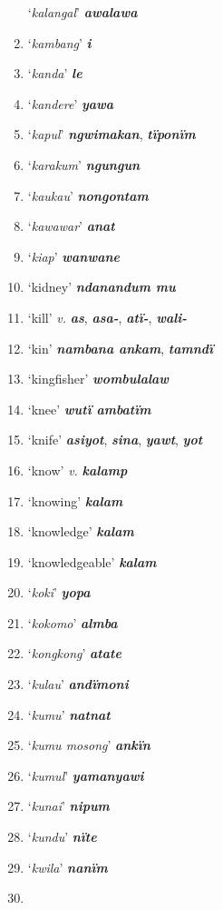 \begin{enumerate}[noitemsep, label={}, align=left, widest=190, labelsep=1ex,leftmargin=*,itemindent=-10pt]
‘\textit{kalangal}’ \textbf{\textit{awalawa}} \item
‘\textit{kambang}’ \textbf{\textit{i}} \item
‘\textit{kanda}’ \textbf{\textit{le}} \item
‘\textit{kandere}’ \textbf{\textit{yawa}} \item
‘\textit{kapul}’ \textbf{\textit{ngwimakan}}, \textbf{\textit{tïponïm}} \item
‘\textit{karakum}’ \textbf{\textit{ngungun}} \item
‘\textit{kaukau}’ \textbf{\textit{nongontam}} \item
‘\textit{kawawar}’ \textbf{\textit{anat}} \item
‘\textit{kiap}’ \textbf{\textit{wanwane}} \item
‘kidney’ \textbf{\textit{ndanandum mu}} \item
‘kill’ \textit{v.} \textbf{\textit{as}}, \textbf{\textit{asa-}}, \textbf{\textit{atï-}}, \textbf{\textit{wali-}} \item
‘kin’ \textbf{\textit{nambana ankam}}, \textbf{\textit{tamndï}} \item
‘kingfisher’ \textbf{\textit{wombulalaw}} \item
‘knee’ \textbf{\textit{wutï ambatïm}} \item
‘knife’ \textbf{\textit{asiyot}}, \textbf{\textit{sina}}, \textbf{\textit{yawt}}, \textbf{\textit{yot}} \item
‘know’ \textit{v.} \textbf{\textit{kalamp}} \item
‘knowing’ \textbf{\textit{kalam}} \item
‘knowledge’ \textbf{\textit{kalam}} \item
‘knowledgeable’ \textbf{\textit{kalam}} \item
‘\textit{koki}’ \textbf{\textit{yopa}} \item
‘\textit{kokomo}’ \textbf{\textit{almba}} \item
‘\textit{kongkong}’ \textbf{\textit{atate}} \item
‘\textit{kulau}’ \textbf{\textit{andïmoni}} \item
‘\textit{kumu}’ \textbf{\textit{natnat}} \item
‘\textit{kumu mosong}’ \textbf{\textit{ankïn}} \item
‘\textit{kumul}’ \textbf{\textit{yamanyawi}} \item
‘\textit{kunai}’ \textbf{\textit{nipum}} \item
‘\textit{kundu}’ \textbf{\textit{nïte}} \item
‘\textit{kwila}’ \textbf{\textit{nanïm}}\\ \item


\end{enumerate}
